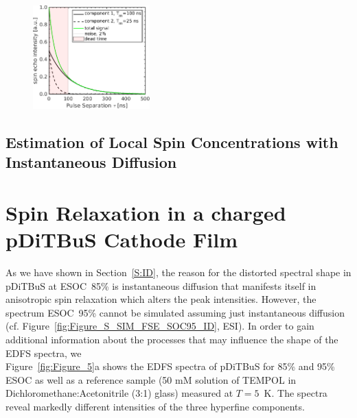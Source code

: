 \begin{figure}[h]
\center
	\includegraphics[width=0.4\textwidth]{./pulse/figures/Figure_S25}
	\caption{}
	\label{fig:Figure_S25}
\end{figure}


\subsection{Estimation of Local Spin Concentrations with Instantaneous Diffusion}



\section{Spin Relaxation in a charged pDiTBuS Cathode Film}
\label{S:RELAX_TIMES}

As we have shown in Section~\ref{S:ID}, the reason for the distorted spectral shape in pDiTBuS at ESOC~85\% is instantaneous diffusion that manifests itself in anisotropic spin relaxation which alters the  peak intensities. However, the spectrum  ESOC~95\% cannot be simulated assuming just instantaneous diffusion (cf. Figure~\ref{fig:Figure_S_SIM_FSE_SOC95_ID}, ESI). In order to gain additional information about the processes that may influence the shape of the EDFS spectra, we \\

Figure~\ref{fig:Figure_5}a shows the EDFS spectra of pDiTBuS for 85\% and 95\% ESOC as well as a reference sample (50 mM solution of TEMPOL in Dichloromethane:Acetonitrile (3:1) glass) measured at $T=5$~K. The spectra reveal markedly different intensities of the three hyperfine components.\\

